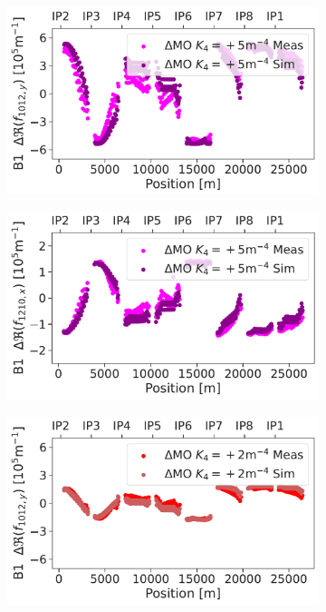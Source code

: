 \begin{figure}[!htb]
    \centering
    \begin{subfigure}{0.47\textwidth}
        \includegraphics[width=\textwidth]{./images/skew_octupoles/responses_coupling/f1012_response_meas_sim_+5_REAL_smoll.pdf}
    \end{subfigure}
    \hfill
    \begin{subfigure}{0.47\textwidth}
        \includegraphics[width=\textwidth]{./images/skew_octupoles/responses_coupling/f1210_response_meas_sim_+5_REAL_smoll.pdf}
    \end{subfigure}
    \par\medskip 
    \begin{subfigure}{0.47\textwidth}
        \includegraphics[width=\textwidth]{./images/skew_octupoles/responses_coupling/f1012_response_meas_sim_+2_REAL_smoll.pdf}

\end{subfigure}
\end{figure}
